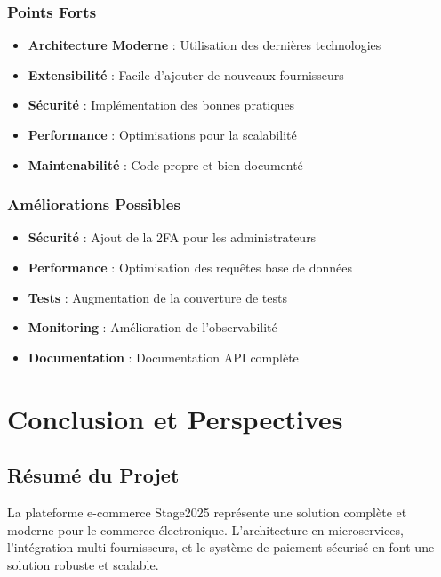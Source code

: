 \documentclass[12pt,a4paper]{report}
\begin{document}
\subsection{Points Forts}

\begin{itemize}
    \item \textbf{Architecture Moderne} : Utilisation des dernières technologies
    \item \textbf{Extensibilité} : Facile d'ajouter de nouveaux fournisseurs
    \item \textbf{Sécurité} : Implémentation des bonnes pratiques
    \item \textbf{Performance} : Optimisations pour la scalabilité
    \item \textbf{Maintenabilité} : Code propre et bien documenté
\end{itemize}

\subsection{Améliorations Possibles}

\begin{itemize}
    \item \textbf{Sécurité} : Ajout de la 2FA pour les administrateurs
    \item \textbf{Performance} : Optimisation des requêtes base de données
    \item \textbf{Tests} : Augmentation de la couverture de tests
    \item \textbf{Monitoring} : Amélioration de l'observabilité
    \item \textbf{Documentation} : Documentation API complète
\end{itemize}

\chapter{Conclusion et Perspectives}

\section{Résumé du Projet}

La plateforme e-commerce Stage2025 représente une solution complète et moderne pour le commerce électronique. L'architecture en microservices, l'intégration multi-fournisseurs, et le système de paiement sécurisé en font une solution robuste et scalable.
\end{document}
